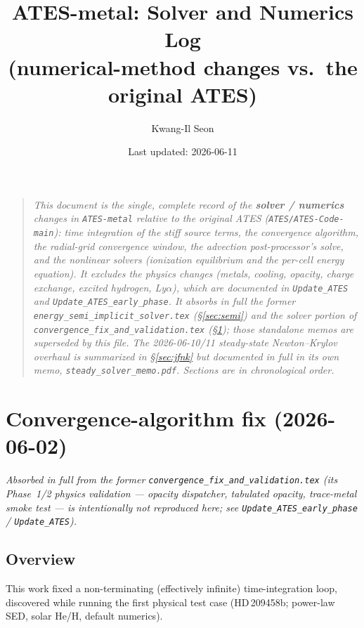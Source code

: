 \documentclass[english,a4paper]{kiseon_memo}
\begin{document}
\title{ATES-metal: Solver and Numerics Log\\(numerical-method changes vs.\ the original ATES)}
\author{Kwang-Il Seon}
\date{Last updated: 2026-06-11}
\maketitle

\begin{quote}\small\itshape
This document is the single, complete record of the \textbf{solver / numerics}
changes in \texttt{ATES-metal} relative to the original ATES
(\texttt{ATES/ATES-Code-main}): time integration of the stiff source terms, the
convergence algorithm, the radial-grid convergence window, the advection
post-processor's solve, and the nonlinear solvers (ionization equilibrium and the
per-cell energy equation). It \emph{excludes} the physics changes (metals,
cooling, opacity, charge exchange, excited hydrogen, Ly$\alpha$), which are
documented in \texttt{Update\_ATES} and \texttt{Update\_ATES\_early\_phase}. It
absorbs in full the former
\texttt{energy\_semi\_implicit\_solver.tex} (\S\ref{sec:semi}) and the
solver portion of \texttt{convergence\_fix\_and\_validation.tex}
(\S\ref{sec:conv}); those standalone memos are superseded by this file.
The 2026-06-10/11 steady-state Newton--Krylov overhaul is \emph{summarized}
in \S\ref{sec:jfnk} but documented in full in its own memo,
\texttt{steady\_solver\_memo.pdf}.
Sections are in chronological order.
\end{quote}

\tableofcontents
\bigskip

\section{Convergence-algorithm fix (2026-06-02)}\label{sec:conv}
\emph{Absorbed in full from the former \texttt{convergence\_fix\_and\_validation.tex}
(its Phase~1/2 \emph{physics} validation --- opacity dispatcher, tabulated opacity,
trace-metal smoke test --- is intentionally not reproduced here; see
\texttt{Update\_ATES\_early\_phase} / \texttt{Update\_ATES}).}

\subsection{Overview}
This work fixed a non-terminating (effectively infinite) time-integration loop,
discovered while running the first physical test case (HD\,209458b; power-law SED,
solar He/H, default numerics).
\end{document}
